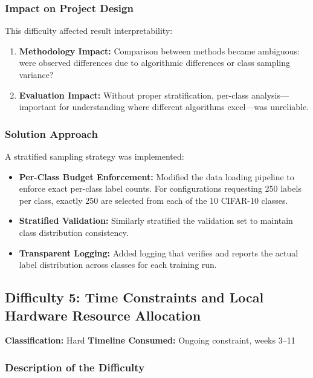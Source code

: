 \subsubsection{Impact on Project Design}

This difficulty affected result interpretability:

\begin{enumerate}
    \item \textbf{Methodology Impact:} Comparison between methods became ambiguous: were observed differences due to algorithmic differences or class sampling variance?
    
    \item \textbf{Evaluation Impact:} Without proper stratification, per-class analysis---important for understanding where different algorithms excel---was unreliable.
\end{enumerate}

\subsubsection{Solution Approach}

A stratified sampling strategy was implemented:

\begin{itemize}
    \item \textbf{Per-Class Budget Enforcement:} Modified the data loading pipeline to enforce exact per-class label counts. For configurations requesting 250 labels per class, exactly 250 are selected from each of the 10 CIFAR-10 classes.
    
    \item \textbf{Stratified Validation:} Similarly stratified the validation set to maintain class distribution consistency.
    
    \item \textbf{Transparent Logging:} Added logging that verifies and reports the actual label distribution across classes for each training run.
\end{itemize}

\subsection{Difficulty 5: Time Constraints and Local Hardware Resource Allocation}

\textbf{Classification:} Hard \quad \textbf{Timeline Consumed:} Ongoing constraint, weeks 3--11

\subsubsection{Description of the Difficulty}

